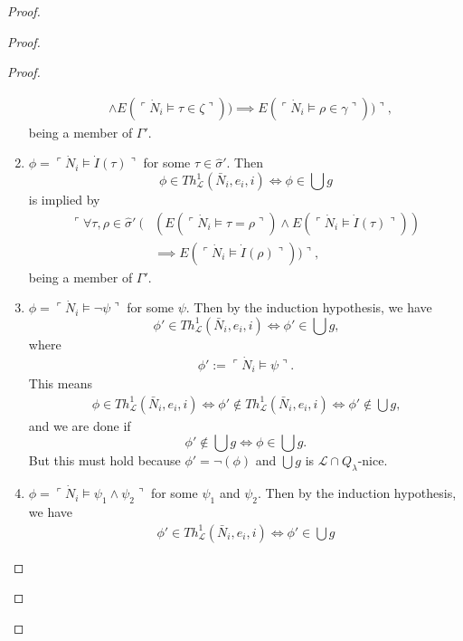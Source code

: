 \documentclass[12pt, twoside]{memoir}
\numberwithin{equation}{section}
\theoremstyle{definition}
\theoremstyle{remark}
\theoremstyle{definition}
\theoremstyle{definition}
\theoremstyle{definition}
\theoremstyle{remark}
\begin{document}
\begin{proof}
\begin{proof}
\begin{proof}
\begin{enumerate}[label=Case \arabic*:, leftmargin=50pt]
\begin{align*}
        & \wedge E(\ulcorner \dot{N}_i \models \tau \in \zeta \urcorner)) \implies E(\ulcorner \dot{N}_i \models \rho \in \gamma \urcorner)) \urcorner,
    \end{align*}
    being a member of $\Gamma'$.
    \item $\phi = \ulcorner \dot{N}_i \models \dot{I}(\tau) \urcorner$ for some $\tau \in \hat{\sigma}'$. Then 
    \begin{equation*}
        \phi \in Th^{1}_{\mathcal{L}}(\bar{N}_i, e_i, i) \iff \phi \in \bigcup g
    \end{equation*}
    is implied by  
    \begin{align*}
        \ulcorner \forall \tau, \rho \in \hat{\sigma}' \ ( & (E(\ulcorner \dot{N}_i \models \tau = \rho \urcorner) \wedge E(\ulcorner \dot{N}_i \models \dot{I}(\tau) \urcorner)) \\
        & \implies E(\ulcorner \dot{N}_i \models \dot{I}(\rho) \urcorner)) \urcorner,
    \end{align*}
    being a member of $\Gamma'$.
    \item $\phi = \ulcorner \dot{N}_i \models \neg \psi \urcorner$ for some $\psi$. Then by the induction hypothesis, we have \begin{equation*}
        \phi' \in Th^{1}_{\mathcal{L}}(\bar{N}_i, e_i, i) \iff \phi' \in \bigcup g \text{,} 
    \end{equation*}
    where
    \begin{align*}
        \phi' := \ulcorner \dot{N}_i \models \psi \urcorner \text{.} 
    \end{align*}
    This means  
    \begin{align*}
        \phi \in Th^{1}_{\mathcal{L}}(\bar{N}_i, e_i, i) \iff \phi' \not \in Th^{1}_{\mathcal{L}}(\bar{N}_i, e_i, i) \iff \phi' \not \in \bigcup g \text{,}
    \end{align*}
    and we are done if 
    \begin{equation*}
        \phi' \not \in \bigcup g \iff \phi \in \bigcup g \text{.}
    \end{equation*}
    But this must hold because $\phi' = \neg(\phi)$ and $\bigcup g$ is $\mathcal{L} \cap Q_{\lambda}$-nice. 
    \item $\phi = \ulcorner \dot{N}_i \models \psi_1 \wedge \psi_2 \urcorner$ for some $\psi_1$ and $\psi_2$. Then by the induction hypothesis, we have 
    \begin{align*}
        \phi' \in Th^{1}_{\mathcal{L}}(\bar{N}_i, e_i, i) \iff \phi' \in \bigcup g 
    \end{align*}

\end{enumerate}
\end{proof}
\end{proof}
\end{proof}
\end{document}
